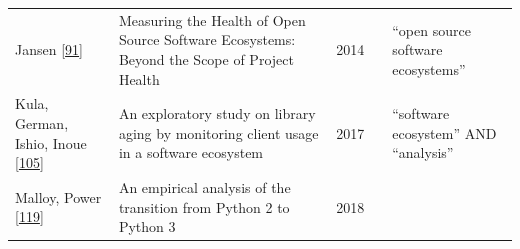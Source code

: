\documentclass[]{book}
\begin{document}
\begin{longtable}[]{@{}lllll@{}}
\begin{minipage}[t]{0.05\columnwidth}
Jansen {[}\protect\hyperlink{ref-Jansen2014}{91}{]}\strut
\end{minipage} & \begin{minipage}[t]{0.31\columnwidth}\raggedright\strut
Measuring the Health of Open Source Software Ecosystems: Beyond the
Scope of Project Health\strut
\end{minipage} & \begin{minipage}[t]{0.02\columnwidth}\raggedright\strut
2014\strut
\end{minipage} & \begin{minipage}[t]{0.34\columnwidth}\raggedright\strut
\strut
\end{minipage} & \begin{minipage}[t]{0.13\columnwidth}\raggedright\strut
``open source software ecosystems''\strut
\end{minipage}\tabularnewline
\begin{minipage}[t]{0.05\columnwidth}\raggedright\strut
Kula, German, Ishio, Inoue
{[}\protect\hyperlink{ref-Kula2017-2}{105}{]}\strut
\end{minipage} & \begin{minipage}[t]{0.31\columnwidth}\raggedright\strut
An exploratory study on library aging by monitoring client usage in a
software ecosystem\strut
\end{minipage} & \begin{minipage}[t]{0.02\columnwidth}\raggedright\strut
2017\strut
\end{minipage} & \begin{minipage}[t]{0.34\columnwidth}\raggedright\strut
\strut
\end{minipage} & \begin{minipage}[t]{0.13\columnwidth}\raggedright\strut
``software ecosystem'' AND ``analysis''\strut
\end{minipage}\tabularnewline
\begin{minipage}[t]{0.05\columnwidth}\raggedright\strut
Malloy, Power {[}\protect\hyperlink{ref-Malloy2018}{119}{]}\strut
\end{minipage} & \begin{minipage}[t]{0.31\columnwidth}\raggedright\strut
An empirical analysis of the transition from Python 2 to Python 3\strut
\end{minipage} & \begin{minipage}[t]{0.02\columnwidth}\raggedright\strut
2018\strut
\end{minipage} & \begin{minipage}[t]{0.34\columnwidth}\raggedright\strut

\end{minipage}
\end{longtable}
\end{document}
